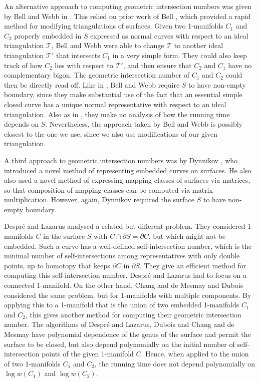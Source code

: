 \documentclass[oneside]{amsart}
\numberwithin{equation}{section}
\theoremstyle{plain}
\theoremstyle{definition}
\newcommand{\calT}{{\mathcal{T}}}
\begin{document}
An alternative approach to computing geometric intersection numbers was given by Bell and Webb in \cite{BellWebb}. This relied on prior work of Bell \cite{Bell}, which provided a rapid method for modifying triangulations of surfaces. Given two 1-manifolds $C_1$ and $C_2$ properly embedded in $S$ expressed as normal curves with respect to an ideal triangulation $\calT$, Bell and Webb were able to change $\calT$ to another ideal triangulation $\calT'$ that intersects $C_1$ in a very simple form. They could also keep track of how $C_2$ lies with respect to $\calT'$, and then ensure that $C_2$ and $C_1$ have no complementary bigon. The geometric intersection number of $C_1$ and $C_2$ could then be directly read off. Like in \cite{SSS2}, Bell and Webb require $S$ to have non-empty boundary, since they make substantial use of the fact that an essential simple closed curve has a unique normal representative with respect to an ideal triangulation. Also as in \cite{SSS2}, they make no analysis of how the running time depends on $S$. Nevertheless, the approach taken by Bell and Webb is possibly closest to the one we use, since we also use modifications of our given triangulation.

A third approach to geometric intersection numbers was by Dynnikov \cite{Dynnikov}, who introduced a novel method of representing embedded curves on surfaces. He also also used a novel method of expressing mapping classes of surfaces via matrices, so that composition of mapping classes can be computed via matrix multiplication. However, again, Dynnikov required the surface $S$ to have non-empty boundary.

Despr\'e and Lazarus \cite{DespreLazarus} analysed a related but different problem. They considered 1-manifolds $C$ in the surface $S$ with $C \cap \partial S = \partial C$, but which might not be embedded. Such a curve has a well-defined self-intersection number, which is the minimal number of self-intersections among representatives with only double points, up to homotopy that keeps $\partial C$ in $\partial S$. They give an efficient method for computing this self-intersection number. 
Despr\'e and Lazarus had to focus on a connected 1-manifold. On the other hand, Chang and de Mesmay \cite{ChangdeMesmay} and Dubois \cite{dubois} considered the same problem, but for 1-manifolds with multiple components. By applying this to a 1-manifold that is the union of two embedded 1-manifolds $C_1$ and $C_2$, this gives another method for computing their geometric intersection number. The algorithms of Despr\'e and Lazarus, Dubois and Chang and de Mesmay have polynomial dependence of the genus of the surface and permit the surface to be closed, but also depend polynomially on the initial number of self-intersection points of the given 1-manifold $C$. Hence, when applied to the union of two 1-manifolds $C_1$ and $C_2$, the running time does not depend polynomially on $\log w(C_1)$ and $\log w(C_2)$.
\end{document}
